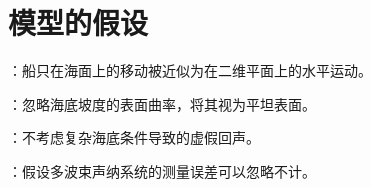 \documentclass[withoutpreface,bwprint]{cumcmthesis} %
\begin{document}
    \section{模型的假设}
    \begin{assumption}
        \label{assumption1}：船只在海面上的移动被近似为在二维平面上的水平运动。
    \end{assumption}
    
    \begin{assumption}
        \label{assumption2}：忽略海底坡度的表面曲率，将其视为平坦表面。
    \end{assumption}
    
    \begin{assumption}
        \label{assumption3}：不考虑复杂海底条件导致的虚假回声。
    \end{assumption}
    
    \begin{assumption}
        \label{assumption4}：假设多波束声纳系统的测量误差可以忽略不计。
    \end{assumption}
\end{document}
